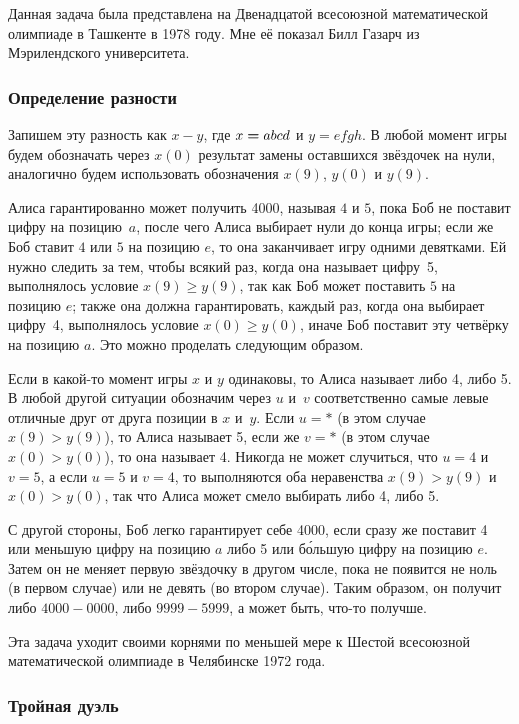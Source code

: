 \documentclass[twoside]{book}
\begin{document}
Данная задача была представлена на Двенадцатой всесоюзной математической олимпиаде в Ташкенте в 1978 году.
Мне её показал Билл Газарч из Мэрилендского университета.%

\subsubsection*{Определение разности}%

Запишем эту разность как $x-y$, где $x\hm=abcd$ и $y=efgh$.
В любой момент игры будем обозначать через $x(0)$ результат замены оставшихся звёздочек на нули, аналогично будем использовать обозначения $x(9)$, $y(0)$ и $y(9)$.

Алиса гарантированно может получить 4000, называя $4$ и $5$, пока Боб не поставит цифру на позицию~$a$, после чего Алиса выбирает нули до конца игры;
если же Боб ставит $4$ или $5$ на позицию $e$, то она заканчивает игру одними девятками.
Ей нужно следить за тем, чтобы всякий раз, когда она называет цифру~5, выполнялось условие $x(9)\ge y(9)$, так как Боб может поставить $5$ на позицию $e$;
также она должна гарантировать,  каждый раз, когда она выбирает цифру~4, выполнялось условие $x(0)\ge y(0)$, иначе Боб поставит эту четвёрку на позицию $a$.
Это можно проделать следующим образом.

Если в какой-то момент игры $x$ и $y$ одинаковы, то Алиса называет либо 4, либо 5.
В любой другой ситуации обозначим через $u$ и~$v$ соответственно самые левые отличные друг от друга позиции в $x$ и~$y$.
Если $u=*$ (в этом случае $x(9)> y(9)$), то Алиса называет 5, если же $v=*$ (в этом случае $x(0)> y(0)$), то она называет 4.
Никогда не может случиться, что $u=4$ и $v=5$, а если $u=5$ и $v=4$, то выполняются оба неравенства $x(9)> y(9)$ и $x(0)> y(0)$, так что Алиса может смело выбирать либо 4, либо 5.

С другой стороны, Боб легко гарантирует себе 4000, если сразу же поставит 4 или меньшую цифру на позицию $a$ либо 5 или б\'{о}льшую цифру на позицию $e$.
Затем он не меняет первую звёздочку в другом числе, пока не появится не ноль (в первом случае) или не девять (во втором случае).
Таким образом, он получит либо $4000-0000$, либо $9999-5999$, а может быть, что-то получше.
\heart

Эта задача уходит своими корнями по меньшей мере к Шестой всесоюзной математической олимпиаде в Челябинске 1972 года.

\subsubsection*{Тройная дуэль}%
\end{document}
